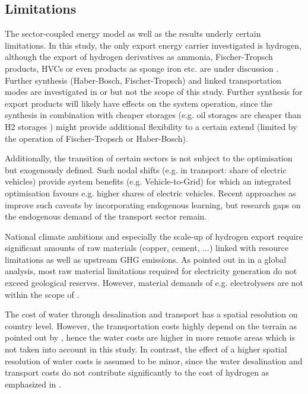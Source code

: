 \subsection{Limitations}
\label{subsec:limitations}

The sector-coupled energy model as well as the results underly certain limitations. In this study, the only export energy carrier investigated is hydrogen, although the export of hydrogen derivatives as ammonia, Fischer-Tropsch products, HVCs or even products as sponge iron etc. are under discussion \cite{Verpoort2023}. Further synthesis (Haber-Bosch, Fischer-Tropsch) and linked transportation modes are investigated in \cite{Hampp2021} or \cite{Galimova2023} but not the scope of this study. Further synthesis for export products will likely have effects on the system operation, since the synthesis in combination with cheaper storages (e.g. oil storages are cheaper than H2 storages \cite{DEA2019TechnologyData}) might provide additional flexibility to a certain extend (limited by the operation of Fischer-Tropsch or Haber-Bosch).

Additionally, the transition of certain sectors is not subject to the optimisation but exogenously defined. Such nodal shifts (e.g. in transport: share of electric vehicles) provide system benefits (e.g. Vehicle-to-Grid) for which an integrated optimisation favours e.g. higher shares of electric vehicles.
Recent approaches as \cite{Zeyen2023} improve such caveats by incorporating endogenous learning, but research gaps on the endogenous demand of the transport sector remain.

National climate ambitions and especially the scale-up of hydrogen export require significant amounts of raw materials (copper, cement, ...) linked with resource limitations as well as upstream GHG emissions. As pointed out in \cite{Wang2023} in a global analysis, most raw material limitations required for electricity generation do not exceed geological reserves. However, material demands of e.g. electrolysers are not within the scope of \cite{Wang2023}.

The cost of water through desalination and transport has a spatial resolution on country level. However, the transportation costs highly depend on the terrain as pointed out by \cite{Caldera2016}, hence the water costs are higher in more remote areas which is not taken into account in this study. In contrast, the effect of a higher spatial resolution of water costs is assumed to be minor, since the water desalination and transport costs do not contribute significantly to the cost of hydrogen as emphasized in \cite{Hampp2023}. %

